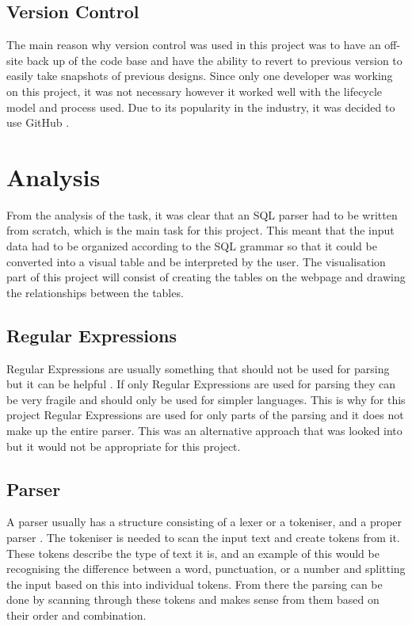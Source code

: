 \subsection{Version Control}

The main reason why version control was used in this project was to have an off-site back up of the code base and have the ability to revert to previous version to easily take snapshots of previous designs. Since only one developer was working on this project, it was not necessary however it worked well with the lifecycle model and process used. Due to its popularity in the industry, it was decided to use GitHub \cite{Github}.

\section{Analysis}

From the analysis of the task, it was clear that an SQL parser had to be written from scratch, which is the main task for this project. This meant that the input data had to be organized according to the SQL grammar so that it could be converted into a visual table and be interpreted by the user. The visualisation part of this project will consist of creating the tables on the webpage and drawing the relationships between the tables.

\subsection{Regular Expressions}

Regular Expressions are usually something that should not be used for parsing but it can be helpful \cite{Parsing}. If only Regular Expressions are used for parsing they can be very fragile and should only be used for simpler languages. This is why for this project Regular Expressions are used for only parts of the parsing and it does not make up the entire parser. This was an alternative approach that was looked into but it would not be appropriate for this project.

\subsection{Parser}

A parser usually has a structure consisting of a lexer or a tokeniser, and a proper parser \cite{Parsing}. The tokeniser is needed to scan the input text and create tokens from it. These tokens describe the type of text it is, and an example of this would be recognising the difference between a word, punctuation, or a number and splitting the input based on this into individual tokens. From there the parsing can be done by scanning through these tokens and makes sense from them based on their order and combination.

